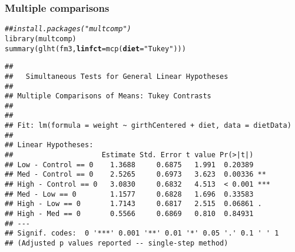 \documentclass[color=usenames,dvipsnames]{beamer}\usepackage[]{graphicx}\usepackage[]{color}
\makeatletter
\newcommand{\hlstr}[1]{\textcolor[rgb]{0.749,0.012,0.012}{#1}}%
\newcommand{\hlcom}[1]{\textcolor[rgb]{0.514,0.506,0.514}{\textit{#1}}}%
\newcommand{\hlstd}[1]{\textcolor[rgb]{0,0,0}{#1}}%
\newcommand{\hlkwc}[1]{\textcolor[rgb]{0,0,0}{\textbf{#1}}}%
\newcommand{\hlkwd}[1]{\textcolor[rgb]{0.004,0.004,0.506}{#1}}%
\newenvironment{kframe}{%
 \def\at@end@of@kframe{}%
 \ifinner\ifhmode%
  \def\at@end@of@kframe{\end{minipage}}%
  \begin{minipage}{\columnwidth}%
 \fi\fi%
 \def\FrameCommand##1{\hskip\@totalleftmargin \hskip-\fboxsep
 \colorbox{shadecolor}{##1}\hskip-\fboxsep
     \hskip-\linewidth \hskip-\@totalleftmargin \hskip\columnwidth}%
 \MakeFramed {\advance\hsize-\width
   \@totalleftmargin\z@ \linewidth\hsize
   \@setminipage}}%
 {\par\unskip\endMakeFramed%
 \at@end@of@kframe}
\newenvironment{knitrout}{}{} %
\makeatother
\begin{document}
\begin{frame}[fragile]
  \frametitle{Multiple comparisons}
\scriptsize
\begin{knitrout}
\color{fgcolor}\begin{kframe}
\begin{alltt}
\hlcom{## install.packages("multcomp")}
\hlkwd{library}\hlstd{(multcomp)}
\hlkwd{summary}\hlstd{(}\hlkwd{glht}\hlstd{(fm3,} \hlkwc{linfct}\hlstd{=}\hlkwd{mcp}\hlstd{(}\hlkwc{diet}\hlstd{=}\hlstr{"Tukey"}\hlstd{)))}
\end{alltt}
\begin{verbatim}
## 
## 	 Simultaneous Tests for General Linear Hypotheses
## 
## Multiple Comparisons of Means: Tukey Contrasts
## 
## 
## Fit: lm(formula = weight ~ girthCentered + diet, data = dietData)
## 
## Linear Hypotheses:
##                     Estimate Std. Error t value Pr(>|t|)    
## Low - Control == 0    1.3688     0.6875   1.991  0.20389    
## Med - Control == 0    2.5265     0.6973   3.623  0.00336 ** 
## High - Control == 0   3.0830     0.6832   4.513  < 0.001 ***
## Med - Low == 0        1.1577     0.6828   1.696  0.33583    
## High - Low == 0       1.7143     0.6817   2.515  0.06861 .  
## High - Med == 0       0.5566     0.6869   0.810  0.84931    
## ---
## Signif. codes:  0 '***' 0.001 '**' 0.01 '*' 0.05 '.' 0.1 ' ' 1
## (Adjusted p values reported -- single-step method)
\end{verbatim}
\end{kframe}
\end{knitrout}
\end{frame}
\end{document}
